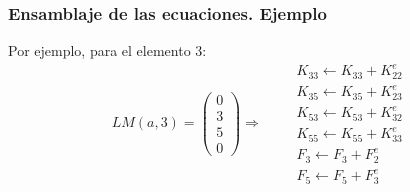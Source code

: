 \documentclass[handout]{beamer}
\begin{document}
\newpage
\begin{frame}
\frametitle{Ensamblaje de las ecuaciones. Ejemplo}
Por ejemplo, para el elemento $3$:
$$
LM(a,3)=\left(
\begin{array}{c}
0 \\
3 \\
5 \\
0
\end{array}
\right) \Rightarrow \qquad
\begin{array}{c}
K_{33} \leftarrow K_{33}+K^e_{22} \\
K_{35} \leftarrow K_{35}+K^e_{23} \\
K_{53} \leftarrow K_{53}+K^e_{32} \\
K_{55} \leftarrow K_{55}+K^e_{33} \\
F_3 \leftarrow F_3 + F^e_2 \\
F_5 \leftarrow F_5 + F^e_3
\end{array}
$$
\end{frame}
\end{document}
